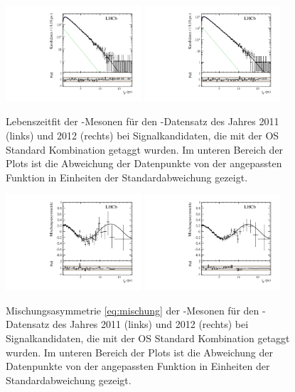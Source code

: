 \begin{figure}[htbp]
	\centering
		\includegraphics[width=0.45\textwidth]{fig/time_OS_2011.pdf}
		\includegraphics[width=0.45\textwidth]{fig/time_OS_2012.pdf}
	\caption{Lebenszeitfit der \Bz-Mesonen für den \lhcb-Datensatz des Jahres \num{2011} (links) und \num{2012} (rechts) bei Signalkandidaten, die mit der OS Standard Kombination getaggt wurden. Im unteren Bereich der Plots ist die Abweichung der Datenpunkte von der angepassten Funktion in Einheiten der Standardabweichung gezeigt.}
	\label{fig:dmd_time} 
\end{figure} 
\begin{figure}[htbp]
	\centering
		\includegraphics[width=0.45\textwidth]{fig/asymmetry_OS_2011.pdf}
		\includegraphics[width=0.45\textwidth]{fig/asymmetry_OS_2012.pdf}
	\caption{Mischungsasymmetrie \eqref{eq:mischung} der \Bz-Mesonen für den \lhcb-Datensatz des Jahres \num{2011} (links) und \num{2012} (rechts) bei Signalkandidaten, die mit der OS Standard Kombination getaggt wurden. Im unteren Bereich der Plots ist die Abweichung der Datenpunkte von der angepassten Funktion in Einheiten der Standardabweichung gezeigt.}
	\label{fig:dmd_asymmetry} 
\end{figure} 

